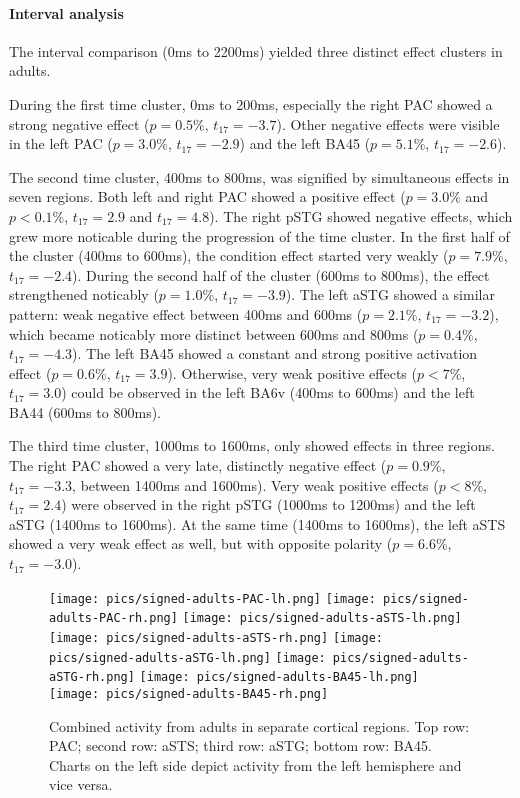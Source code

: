 \paragraph{Interval analysis}
The interval comparison (0ms to 2200ms) yielded three distinct effect clusters in adults.

During the first time cluster, 0ms to 200ms, especially the right PAC showed a strong negative effect ($p = 0.5\%$, $t_{17} = -3.7$).
Other negative effects were visible in the left PAC ($p = 3.0\%$, $t_{17} = -2.9$) and the left BA45 ($p = 5.1\%$, $t_{17} = -2.6$).

The second time cluster, 400ms to 800ms, was signified by simultaneous effects in seven regions.
Both left and right PAC showed a positive effect ($p = 3.0\%$ and $p < 0.1\%$, $t_{17} = 2.9$ and $t_{17} = 4.8$).
The right pSTG showed negative effects, which grew more noticable during the progression of the time cluster.
In the first half of the cluster (400ms to 600ms), the condition effect started very weakly ($p = 7.9\%$, $t_{17} = -2.4$).
During the second half of the cluster (600ms to 800ms), the effect strengthened noticably ($p = 1.0\%$, $t_{17} = -3.9$).
The left aSTG showed a similar pattern: weak negative effect between 400ms and 600ms ($p = 2.1\%$, $t_{17} = -3.2$), which became noticably more distinct between 600ms and 800ms ($p = 0.4\%$, $t_{17} = -4.3$).
The left BA45 showed a constant and strong positive activation effect ($p = 0.6\%$, $t_{17} = 3.9$).
Otherwise, very weak positive effects ($p < 7\%$, $t_{17} = 3.0$) could be observed in the left BA6v (400ms to 600ms) and the left BA44 (600ms to 800ms).

The third time cluster, 1000ms to 1600ms, only showed effects in three regions.
The right PAC showed a very late, distinctly negative effect ($p = 0.9\%$, $t_{17} = -3.3$, between 1400ms and 1600ms).
Very weak positive effects ($p < 8\%$, $t_{17} = 2.4$) were observed in the right pSTG (1000ms to 1200ms) and the left aSTG (1400ms to 1600ms).
At the same time (1400ms to 1600ms), the left aSTS showed a very weak effect as well, but with opposite polarity ($p = 6.6\%$, $t_{17} = -3.0$).

\begin{figure}[H]
\begin{center}
\texttt{[image: pics/signed-adults-PAC-lh.png]}
\texttt{[image: pics/signed-adults-PAC-rh.png]}
\texttt{[image: pics/signed-adults-aSTS-lh.png]}
\texttt{[image: pics/signed-adults-aSTS-rh.png]}
\texttt{[image: pics/signed-adults-aSTG-lh.png]}
\texttt{[image: pics/signed-adults-aSTG-rh.png]}
\texttt{[image: pics/signed-adults-BA45-lh.png]}
\texttt{[image: pics/signed-adults-BA45-rh.png]}
\caption{\label{4.3.activity.adults.ventral} Combined activity from adults in separate cortical regions. Top row: PAC; second row: aSTS; third row: aSTG; bottom row: BA45. Charts on the left side depict activity from the left hemisphere and vice versa.}
\end{center}
\end{figure}


